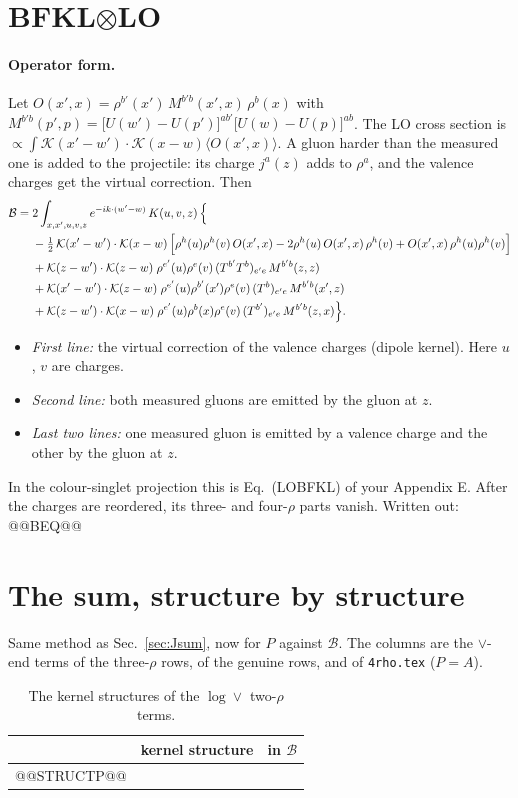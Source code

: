 \documentclass[10pt]{article}
\numberwithin{equation}{section}
\newcommand{\KK}{\mathcal K}
\newcommand{\B}{\mathcal B}
\begin{document}
\section{BFKL\texorpdfstring{$\otimes$}{x}LO}\label{sec:B}
\paragraph{Operator form.} Let $O(x',x)=\rho^{b'}(x')\,M^{b'b}(x',x)\,\rho^b(x)$ with $M^{b'b}(p',p)=\big[U(w')-U(p')\big]^{ab'}\big[U(w)-U(p)\big]^{ab}$. The LO cross section is $\propto\int\KK(x'-w')\cdot\KK(x-w)\langle O(x',x)\rangle$. A gluon harder than the measured one is added to the projectile: its charge $j^a(z)$ adds to $\rho^a$, and the valence charges get the virtual correction. Then
\begin{align}
\B={}&2\int_{x,x',u,v,z}e^{-ik\cdot(w'-w)}\,K(u,v,z)\,\Big\{\notag\\
&-\tfrac12\,\KK(x'-w')\cdot\KK(x-w)\,\Big[\rho^h(u)\rho^h(v)\,O(x',x)-2\rho^h(u)\,O(x',x)\,\rho^h(v)+O(x',x)\,\rho^h(u)\rho^h(v)\Big]\notag\\
&+\KK(z-w')\cdot\KK(z-w)\;\rho^{e'}(u)\rho^e(v)\,(T^{b'}T^b)_{e'e}\,M^{b'b}(z,z)\notag\\
&+\KK(x'-w')\cdot\KK(z-w)\;\rho^{e'}(u)\rho^{b'}(x')\rho^e(v)\,(T^b)_{e'e}\,M^{b'b}(x',z)\notag\\
&+\KK(z-w')\cdot\KK(x-w)\;\rho^{e'}(u)\rho^{b}(x)\rho^e(v)\,(T^{b'})_{e'e}\,M^{b'b}(z,x)\Big\}.
\label{eq:Bop}
\end{align}
\begin{itemize}
\item \emph{First line:} the virtual correction of the valence charges (dipole kernel). Here $u$, $v$ are charges.
\item \emph{Second line:} both measured gluons are emitted by the gluon at $z$.
\item \emph{Last two lines:} one measured gluon is emitted by a valence charge and the other by the gluon at $z$.
\end{itemize}
In the colour-singlet projection this is Eq.~(LOBFKL) of your Appendix E. After the charges are reordered, its three- and four-$\rho$ parts vanish. Written out:
@@BEQ@@

\section{The sum, structure by structure}\label{sec:Bsum}
Same method as Sec.~\ref{sec:Jsum}, now for $P$ against $\B$. The columns are the $\vee$-end terms of the three-$\rho$ rows, of the genuine rows, and of \texttt{4rho.tex} ($P=A$).
\begin{table}[h]
\centering\small
\begin{tabular}{@{}l l c@{}}
& kernel structure & in $\B$\\ \hline
@@STRUCTP@@
\end{tabular}
\caption{The kernel structures of the $\log\vee$ two-$\rho$ terms.}
\label{tab:SP}
\end{table}
\end{document}

